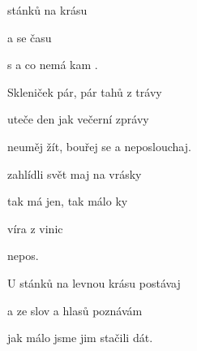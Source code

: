 

\zs
{} stánků na  krásu

 a  se času

s  a  co nemá kam .
\ks

\zs
Skleniček pár, pár tahů z trávy

uteče den jak večerní zprávy

neuměj žít, bouřej se a neposlouchaj.
\ks

\zr
{} zahlídli svět maj na  vrásky

tak má jen, tak málo ky

 víra  z vinic

nepos.
\kr

\zs
U stánků na levnou krásu postávaj

a ze slov a hlasů poznávám

jak málo jsme jim stačili dát.
\ks

\zr \kr

\zr \kr

\kp







